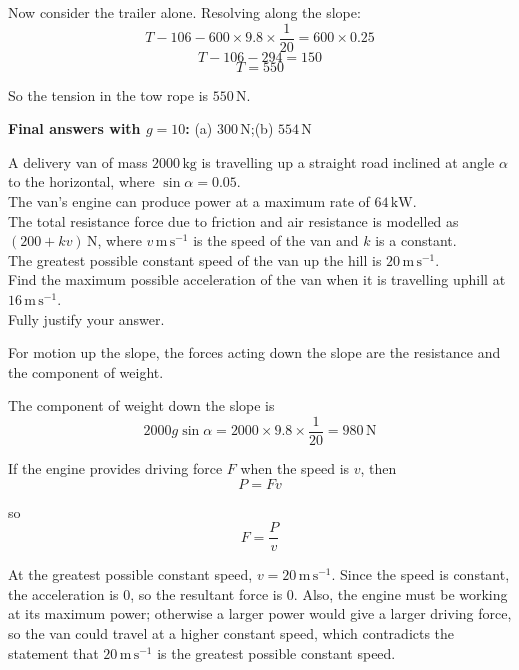 \documentclass[leqno]{article}
\begin{document}
\begin{enumerate}[
  label=\textbf{\arabic*.},
  leftmargin=*,
  topsep=0pt,
  partopsep=0pt,
  parsep=0pt
]
\begin{djsSolution}
\begin{enumerate}[label=\textbf{(\alph*)}, start=1]
  Now consider the trailer alone. Resolving along the slope:
  \[
  T-106-600\times 9.8\times \frac{1}{20}=600\times 0.25
  \]
  \[
  T-106-294=150
  \]
  \[
  T=550
  \]

  So the tension in the tow rope is \(550\,\mathrm{N}\).
\end{enumerate}
\par\medskip\noindent\textbf{Final answers with \(g = 10\):} (a) \(300\,\mathrm{N}\);\quad (b) \(554\,\mathrm{N}\)
\end{djsSolution}


\newpage

\questionitem

A delivery van of mass $2000\,\mathrm{kg}$ is travelling up a straight road inclined at angle $\alpha$ to the horizontal, where $\sin\alpha=0.05$. \\

The van's engine can produce power at a maximum rate of $64\,\mathrm{kW}$. \\

The total resistance force due to friction and air resistance is modelled as $(200+kv)\,\mathrm{N}$, where $v\,\mathrm{m\,s^{-1}}$ is the speed of the van and $k$ is a constant. \\

The greatest possible constant speed of the van up the hill is $20\,\mathrm{m\,s^{-1}}$. \\

Find the maximum possible acceleration of the van when it is travelling uphill at $16\,\mathrm{m\,s^{-1}}$. \\

Fully justify your answer.  \\

\vspace*{10pt}

\begin{djsSolution}
For motion up the slope, the forces acting down the slope are the resistance and the component of weight.

The component of weight down the slope is
\[
2000g\sin\alpha = 2000 \times 9.8 \times \frac{1}{20} = 980\,\mathrm{N}
\]

If the engine provides driving force $F$ when the speed is $v$, then
\[
P = Fv
\]

so
\[
F = \frac{P}{v}
\]

At the greatest possible constant speed, $v=20\,\mathrm{m\,s^{-1}}$. Since the speed is constant, the acceleration is $0$, so the resultant force is $0$. Also, the engine must be working at its maximum power; otherwise a larger power would give a larger driving force, so the van could travel at a higher constant speed, which contradicts the statement that $20\,\mathrm{m\,s^{-1}}$ is the greatest possible constant speed.


\end{djsSolution}
\end{enumerate}
\end{document}
